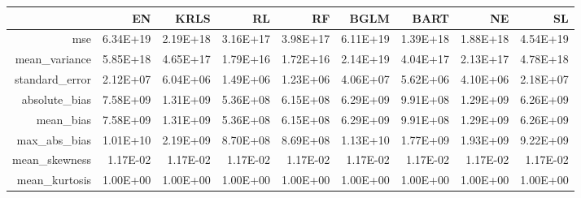 \begin{table}[ht]
\centering
\begin{tabular}{rrrrrrrrr}
  \hline
 & EN & KRLS & RL & RF & BGLM & BART & NE & SL \\ 
  \hline
mse & 6.34E+19 & 2.19E+18 & 3.16E+17 & 3.98E+17 & 6.11E+19 & 1.39E+18 & 1.88E+18 & 4.54E+19 \\ 
  mean\_variance & 5.85E+18 & 4.65E+17 & 1.79E+16 & 1.72E+16 & 2.14E+19 & 4.04E+17 & 2.13E+17 & 4.78E+18 \\ 
  standard\_error & 2.12E+07 & 6.04E+06 & 1.49E+06 & 1.23E+06 & 4.06E+07 & 5.62E+06 & 4.10E+06 & 2.18E+07 \\ 
  absolute\_bias & 7.58E+09 & 1.31E+09 & 5.36E+08 & 6.15E+08 & 6.29E+09 & 9.91E+08 & 1.29E+09 & 6.26E+09 \\ 
  mean\_bias & 7.58E+09 & 1.31E+09 & 5.36E+08 & 6.15E+08 & 6.29E+09 & 9.91E+08 & 1.29E+09 & 6.26E+09 \\ 
  max\_abs\_bias & 1.01E+10 & 2.19E+09 & 8.70E+08 & 8.69E+08 & 1.13E+10 & 1.77E+09 & 1.93E+09 & 9.22E+09 \\ 
  mean\_skewness & 1.17E-02 & 1.17E-02 & 1.17E-02 & 1.17E-02 & 1.17E-02 & 1.17E-02 & 1.17E-02 & 1.17E-02 \\ 
  mean\_kurtosis & 1.00E+00 & 1.00E+00 & 1.00E+00 & 1.00E+00 & 1.00E+00 & 1.00E+00 & 1.00E+00 & 1.00E+00 \\ 
   \hline
\end{tabular}
\end{table}
